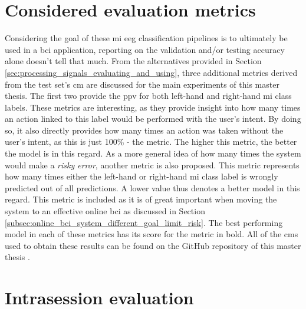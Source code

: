 \section{Considered evaluation metrics}
\label{sec:evaluation_eval_metrics}

Considering the goal of these \gls{mi} \gls{eeg} classification pipelines is to ultimately be used in a \gls{bci} application, reporting on the validation and/or testing accuracy alone doesn't tell that much.
From the alternatives provided in Section \ref{sec:processing_signals_evaluating_and_using}, three additional metrics derived from the test set's \gls{cm} are discussed for the main experiments of this master thesis.
The first two provide the \gls{ppv} for both left-hand and right-hand \gls{mi} class labels.
These metrics are interesting, as they provide insight into how many times an action linked to this label would be performed with the user's intent.
By doing so, it also directly provides how many times an action was taken without the user's intent, as this is just 100\% - the metric.
The higher this metric, the better the model is in this regard.
As a more general idea of how many times the system would make a \textit{risky error}, another metric is also proposed.
This metric represents how many times either the left-hand or right-hand \gls{mi} class label is wrongly predicted out of all predictions.
A lower value thus denotes a better model in this regard.
This metric is included as it is of great important when moving the system to an effective online \gls{bci} as discussed in Section \ref{subsec:online_bci_system_different_goal_limit_risk}.
The best performing model in each of these metrics has its score for the metric in bold.
All of the \glspl{cm} used to obtain these results can be found on the GitHub repository of this master thesis \citep{github_project}.


\section{Intrasession evaluation}
\label{sec:evaluation_intrasession}



